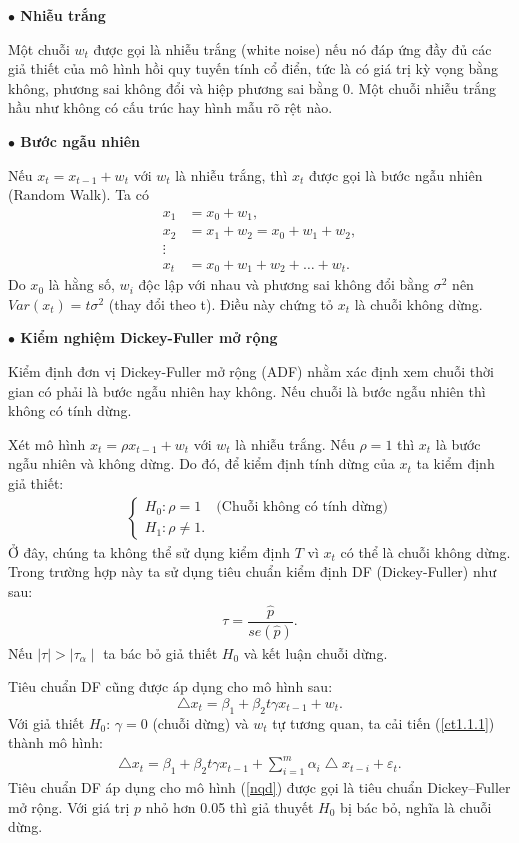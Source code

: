 \documentclass[12pt, a4paper,oneside]{book}
\theoremstyle{definition}
\begin{document}
\textbf{$\bullet$ Nhiễu trắng}

Một chuỗi $ w_t $ được gọi là nhiễu trắng (white noise) nếu nó đáp ứng đầy đủ các giả thiết của mô hình hồi quy tuyến tính cổ điển, tức là có giá trị kỳ vọng bằng không, phương sai không đổi và hiệp phương sai bằng $0$. Một chuỗi nhiễu trắng hầu như không có cấu trúc hay hình mẫu rõ rệt nào.

\textbf{$\bullet$ Bước ngẫu nhiên}

Nếu $ x_t = x_{t-1} + w_t $ với $ w_t $ là nhiễu trắng, thì $ x_t $ được gọi là bước ngẫu nhiên (Random Walk). Ta có
\begin{align*}
x_1 & = x_0+w_1,\\
x_2 & = x_1+w_2 = x_0+w_1+w_2,\\
\vdots\\
x_t & = x_0+w_1+w_2+\dots+w_t.
\end{align*}
Do $ x_0 $ là hằng số, $ w_i $ độc lập với nhau và phương sai không đổi bằng $ \sigma^2 $ nên
$ Var(x_t) = t\sigma^2 $ (thay đổi theo t). Điều này chứng tỏ $x_t$ là chuỗi không dừng.

\textbf{$\bullet$ Kiểm nghiệm Dickey-Fuller mở rộng}

Kiểm định đơn vị Dickey-Fuller mở rộng (ADF) nhằm xác định xem chuỗi thời gian có phải là bước ngẫu nhiên hay không. Nếu chuỗi là bước ngẫu nhiên thì không có tính dừng.

Xét mô hình $ x_t = \rho x_{t-1} + w_t $ với $ w_t $ là nhiễu trắng. Nếu $ \rho = 1 $ thì $ x_t $ là bước ngẫu nhiên và không dừng. Do đó, để kiểm định tính dừng của $ x_t $ ta kiểm định giả thiết: 
\begin{align*}
\begin{cases} 
H_0: \rho=1& \text{(Chuỗi không có tính dừng)}\\
H_1: \rho\neq1.
\end{cases}
\end{align*} 
Ở đây, chúng ta không thể sử dụng kiểm định $T$ vì $x_t$ có thể là chuỗi không dừng. Trong trường hợp này ta sử dụng tiêu chuẩn kiểm định DF (Dickey-Fuller) như sau:
\begin{align*}
\tau=\dfrac{\widehat{p}}{se(\widehat{p})}.
\end{align*} 
Nếu $ \mid\tau\mid>\mid\tau_\alpha\mid $ ta bác bỏ giả thiết $ H_0 $ và kết luận chuỗi dừng.

Tiêu chuẩn DF cũng được áp dụng cho mô hình sau:
\begin{equation}
\bigtriangleup x_t=\beta_1+\beta_2t\gamma x_{t-1} +w_t. \label{ct1.1.1}
\end{equation} 
Với giả thiết $ H_0 $: $ \gamma = 0 $ (chuỗi dừng) và $ w_t $ tự tương quan, ta cải tiến (\ref{ct1.1.1}) thành mô hình:
\begin{align}
\bigtriangleup x_t=\beta_1+\beta_2t\gamma x_{t-1} + \sum_{i=1}^{m}\alpha_i\bigtriangleup x_{t-i} +\varepsilon_t. \label{nqd}
\end{align}
Tiêu chuẩn DF áp dụng cho mô hình (\ref{nqd}) được gọi là tiêu chuẩn Dickey–Fuller mở rộng. Với giá trị $p$ nhỏ hơn 0.05 thì giả thuyết $H_0$ bị bác bỏ, nghĩa là chuỗi dừng.
\end{document}
